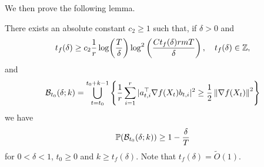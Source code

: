 We then prove the following lemma.
\begin{lemma}\label{lem:block-progress}
    There exists an absolute constant $c_2 \geq 1$ such that, if $\delta > 0$ and
    \begin{align*}
        t_f(\delta) \geq c_2 \frac{1}{r}\log(\frac{T}{\delta}) \log^2\left(\frac{Ct_f(\delta)rm T}{\delta} \right), \quad t_f(\delta) \in \bZ,
    \end{align*}
    and 
    \begin{align*}
        \mathcal B_{t_0}(\delta ; k) = \bigcup_{t=t_0}^{t_0+k-1} \set{\frac 1r \sum_{i=1}^r |a_{t,i}^\top \grad f(X_t) b_{t,i}|^2 \geq \frac 12 \mg{\grad f(X_t)}^2}
    \end{align*}
    we have
    \begin{align*}
        \P(\mathcal B_{t_0}(\delta; k)) \geq 1 - \frac{\delta}{T}
    \end{align*}
    for $0 < \delta < 1$, $t_0 \geq 0$ and $k \geq t_f(\delta)$. Note that $t_f(\delta) = \widetilde{O}(1)$. 
\end{lemma}
